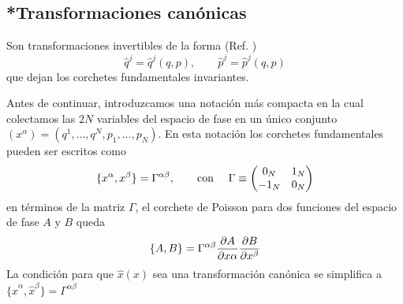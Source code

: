 \subsection{*Transformaciones canónicas}
Son transformaciones invertibles de la forma (Ref. \cite{Schwichtenberg:2018dri})
\begin{equation}
  \hat{q}^j=\hat{q}^j(q,p),\qquad \hat{p}^j=\hat{p}^j(q,p)
\end{equation}
que dejan los corchetes fundamentales invariantes.

Antes de continuar, introduzcamos una notación más compacta en la cual colectamos las $2N$ variables del espacio de fase en un único conjunto $(x^\alpha)=(q^1,...,q^N,p_1,...,p_N)$. En esta notación los corchetes fundamentales pueden ser escritos como
\begin{equation}
  \{x^\alpha,x^\beta\}=\Gamma^{\alpha \beta},\qquad \mbox{con }\quad \Gamma\equiv \mqty(0_N&1_N\\-1_N&0_N)
\end{equation}
en términos de la matriz $\Gamma$, el corchete de Poisson para dos funciones del espacio de fase $A$ y $B$ queda
\begin{equation}
  \{A,B\}=\Gamma^{\alpha \beta}\pdv{A}{x\alpha}\pdv{B}{x^\beta}
\end{equation}
La condición para que $\hat{x}(x)$ sea una transformación canónica se simplifica a $\{\hat{x}^\alpha,\hat{x}^\beta\}=\Gamma^{\alpha \beta}$























































